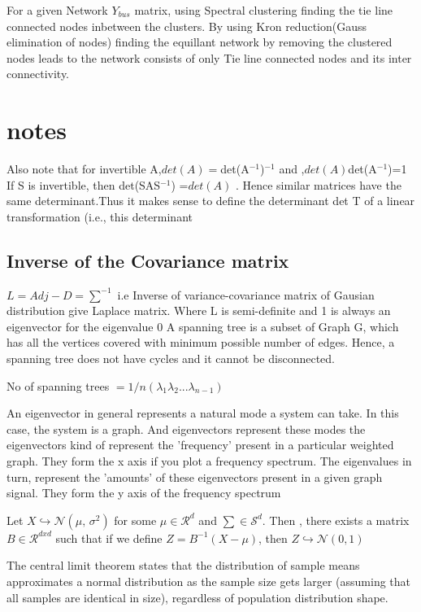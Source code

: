 \documentclass[12pt]{article}
\begin{document}
For a given Network $Y_{bus}$ matrix, using Spectral clustering finding the tie line connected nodes inbetween the clusters. By using Kron reduction(Gauss elimination of nodes) finding the equillant network by removing the clustered nodes leads to the network consists of only Tie line connected nodes and its inter connectivity.

\section{notes}

Also note that for invertible A,$det(A)=$det(A$^{-1}$)$^{-1}$ and ,$det(A)$det(A$^{-1}$)=1 If S is invertible, 
then det(SAS$^{-1}$) =$det(A)$ . Hence similar matrices have the same determinant.Thus it makes sense to define the determinant det T of a linear transformation (i.e., this determinant

\subsection{Inverse of the Covariance matrix }

$L=Adj-D=\sum^{-1}$ i.e Inverse of variance-covariance matrix of Gausian distribution give Laplace matrix.
Where L is semi-definite and 1 is always an eigenvector for the eigenvalue 0
A spanning tree is a subset of Graph G, which has all the vertices covered with minimum possible number of edges. Hence, a spanning tree does not have cycles and it cannot be disconnected.

No of spanning trees $=1/n(\lambda_1\lambda_2...\lambda_{n-1})$

An eigenvector in general represents a natural mode a system can take. In this case, the system is a graph. And eigenvectors represent these modes
the eigenvectors kind of represent the 'frequency' present in a particular weighted graph. They form the x axis if you plot a frequency spectrum.
The eigenvalues in turn, represent the 'amounts' of these eigenvectors present in a given graph signal. They form the y axis of the frequency spectrum

Let $X \hookrightarrow  \mathcal{N}(\mu,\,\sigma^{2})$ for some $\mu  \in \mathcal{R}^d$ and $\sum \in \mathcal{S}^d$. Then , there exists a matrix  $B\in \mathcal{R}^{dxd}$ such that if we define $Z=B^{-1}(X-\mu)$, then $Z\hookrightarrow\mathcal{N}(0,1)$

The central limit theorem states that the distribution of sample means approximates a normal distribution as the sample size gets larger (assuming that all samples are identical in size), regardless of population distribution shape.
\end{document}

